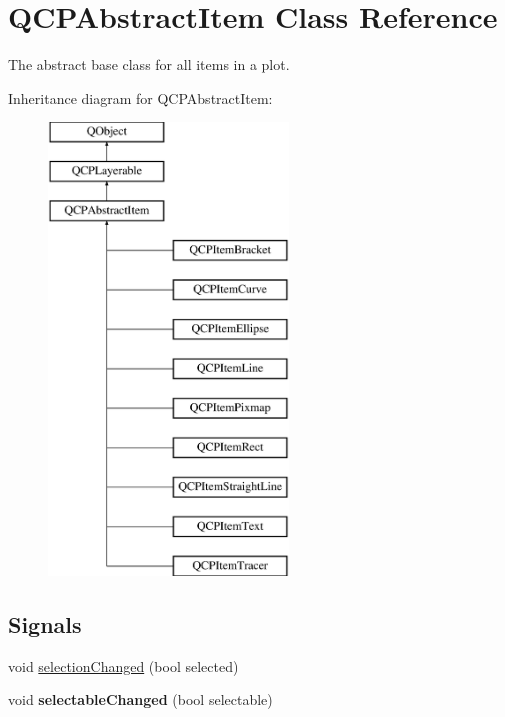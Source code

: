 \hypertarget{class_q_c_p_abstract_item}{}\section{Q\+C\+P\+Abstract\+Item Class Reference}
\label{class_q_c_p_abstract_item}


The abstract base class for all items in a plot.  


Inheritance diagram for Q\+C\+P\+Abstract\+Item\+:\begin{figure}[H]
\begin{center}
\leavevmode
\includegraphics[height=12.000000cm]{class_q_c_p_abstract_item}
\end{center}
\end{figure}
\subsection*{Signals}
\begin{DoxyCompactItemize}
\item 
void \mbox{\hyperlink{class_q_c_p_abstract_item_aa5cffb034fc65dbb91c77e02c1c14251}{selection\+Changed}} (bool selected)
\item 
\mbox{\label{class_q_c_p_abstract_item_a5b266c11aac61cb511901f3911dac2a3}} 
void {\bfseries selectable\+Changed} (bool selectable)
\end{DoxyCompactItemize}
